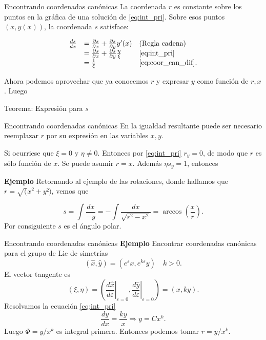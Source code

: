 \documentclass{article}
\renewcommand{\epsilon}{\varepsilon}
\newcounter{ejemplo_cont}
\begin{document}
{Encontrando coordenadas canónicas}
La coordenada $r$ es constante sobre los puntos en la gráfica de una solución de \eqref{eq:int_pri}. Sobre esos puntos $(x,y(x))$, la coordenada $s$ satisface:

\begin{equation} \label{eq:coor_can_s}
\begin{array}{lll}
\frac{ds}{dx}&=\frac{\partial s}{\partial x}+\frac{\partial s}{\partial y} y'(x) & \hbox{(Regla cadena)}\\
&=\frac{\partial s}{\partial x}+\frac{\partial s}{\partial y} \frac{\eta}{\xi} &
  \eqref{eq:int_pri}\\
&=\frac{1}{\xi} &\hbox{\eqref{eq:coor_can_dif}}.
\end{array}
\end{equation}

Ahora podemos aprovechar que ya conocemos $r$ y  expresar $y$ como función de $r,x$. Luego

{Teorema: Expresión para $s$}
 


 











{Encontrando coordenadas canónicas}
En la igualdad resultante puede ser necesario reemplazar $r$ por su expresión en las variables $x,y$.


Si ocurriese que $\xi=0$ y $\eta\neq 0$. Entonces por \eqref{eq:int_pri} $r_y=0$, de modo que $r$ es sólo función de $x$. Se puede asumir $r=x$. Además $\eta s_y=1$, entonces


\textbf{Ejemplo} Retornando al ejemplo de las rotaciones, donde hallamos que $r=\sqrt(x^2+y²)$, vemos que

\[s=\int\frac{dx}{-y}=-\int\frac{dx}{\sqrt{r^2-x^2}}=\arccos\left(\frac{x}{r}\right).\]
Por consiguiente  $s$ es el ángulo polar.





{Encontrando coordenadas canónicas}\label{pag_ejem_canon1}
\textbf{Ejemplo} Encontrar coordenadas canónicas para el grupo de Lie de simetrías
\[(\hat{x},\hat{y})=(e^{\epsilon}x,e^{k\epsilon}y)\quad k>0.\]
El vector tangente es
\[(\xi,\eta)=\left(\left.\frac{d\hat{x}}{d\epsilon}\right|_{\epsilon=0},\left.\frac{d\hat{y}}{d\epsilon}\right|_{\epsilon=0}\right)=(x,ky).\]
Resolvamos la ecuación  \eqref{eq:int_pri} 
\[\frac{dy}{dx}=\frac{ky}{x}\Rightarrow y=Cx^k.\]
Luego $\Phi=y/x^k$ es integral primera. Entonces podemos tomar $r=y/x^k$. 
\end{document}
